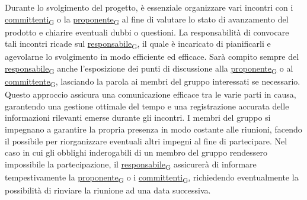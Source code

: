 Durante lo svolgimento del progetto, è essenziale organizzare vari incontri con i \href{https://7last.github.io/docs/rtb/documentazione-interna/glossario\#committente}{committenti\textsubscript{G}} o la \href{https://7last.github.io/docs/rtb/documentazione-interna/glossario\#proponente}{proponente\textsubscript{G}} al fine di valutare lo stato di avanzamento del prodotto e chiarire eventuali dubbi o questioni. La responsabilità di convocare tali incontri ricade sul \href{https://7last.github.io/docs/rtb/documentazione-interna/glossario\#responsabile}{responsabile\textsubscript{G}}, il quale è incaricato di pianificarli e agevolarne lo svolgimento in modo efficiente ed efficace. Sarà compito sempre del \href{https://7last.github.io/docs/rtb/documentazione-interna/glossario\#responsabile}{responsabile\textsubscript{G}} anche l’esposizione dei punti di discussione alla \href{https://7last.github.io/docs/rtb/documentazione-interna/glossario\#proponente}{proponente\textsubscript{G}} o al \href{https://7last.github.io/docs/rtb/documentazione-interna/glossario\#committente}{committente\textsubscript{G}}, lasciando la parola ai membri del gruppo interessati se necessario. Questo approccio assicura una comunicazione efficace tra le varie parti in causa, garantendo una gestione ottimale del tempo e una registrazione accurata delle informazioni rilevanti emerse durante gli incontri. I membri del gruppo si impegnano a garantire la propria presenza in modo costante alle riunioni, facendo il possibile per riorganizzare eventuali altri impegni al fine di partecipare. Nel caso in cui gli obblighi inderogabili di un membro del gruppo rendessero impossibile la partecipazione, il \href{https://7last.github.io/docs/rtb/documentazione-interna/glossario\#responsabile}{responsabile\textsubscript{G}} assicurerà di informare tempestivamente la \href{https://7last.github.io/docs/rtb/documentazione-interna/glossario\#proponente}{proponente\textsubscript{G}} o i \href{https://7last.github.io/docs/rtb/documentazione-interna/glossario\#committente}{committenti\textsubscript{G}}, richiedendo eventualmente la possibilità di rinviare la riunione ad una data successiva.

